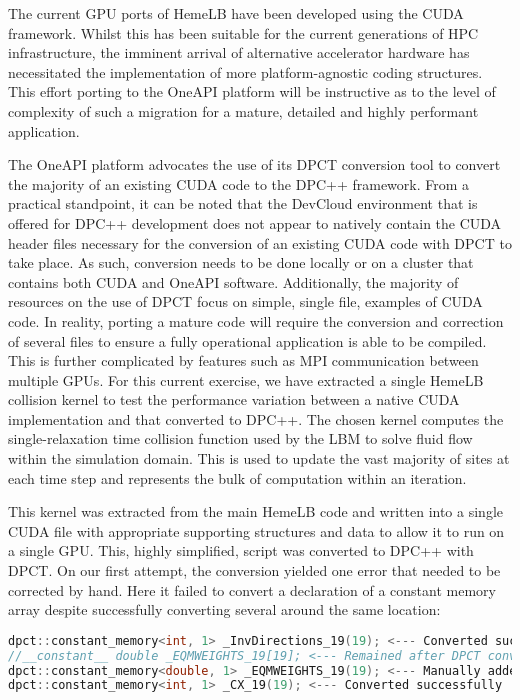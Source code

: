 The current GPU ports of HemeLB have been developed using the CUDA framework. Whilst this has been suitable for the current generations of HPC infrastructure, the imminent arrival of alternative accelerator hardware has necessitated the implementation of more platform-agnostic coding structures. This effort porting to the OneAPI platform will be instructive as to the level of complexity of such a migration for a mature, detailed and highly performant application.

The OneAPI platform advocates the use of its DPCT conversion tool to convert the majority of an existing CUDA code to the DPC++ framework. From a practical standpoint, it can be noted that the DevCloud environment that is offered for DPC++ development does not appear to natively contain the CUDA header files necessary for the conversion of an existing CUDA code with DPCT to take place. As such, conversion needs to be done locally or on a cluster that contains both CUDA and OneAPI software. Additionally, the majority of resources on the use of DPCT focus on simple, single file, examples of CUDA code. In reality, porting a mature code will require the conversion and correction of several files to ensure a fully operational application is able to be compiled. This is further complicated by features such as MPI communication between multiple GPUs. For this current exercise, we have extracted a single HemeLB collision kernel to test the performance variation between a native CUDA implementation and that converted to DPC++. The chosen kernel computes the single-relaxation time collision function used by the LBM to solve fluid flow within the simulation domain. This is used to update the vast majority of sites at each time step and represents the bulk of computation within an iteration.

This kernel was extracted from the main HemeLB code and written into a single CUDA file with appropriate supporting structures and data to allow it to run on a single GPU. This, highly simplified, script was converted to DPC++ with DPCT. On our first attempt, the conversion yielded one error that needed to be corrected by hand. Here it failed to convert a declaration of a constant memory array despite successfully converting several around the same location:

\begin{lstlisting}[language=C++,basicstyle=\small]
dpct::constant_memory<int, 1> _InvDirections_19(19); <--- Converted successfully
//__constant__ double _EQMWEIGHTS_19[19]; <--- Remained after DPCT conversion
dpct::constant_memory<double, 1> _EQMWEIGHTS_19(19); <--- Manually added
dpct::constant_memory<int, 1> _CX_19(19); <--- Converted successfully
\end{lstlisting}

